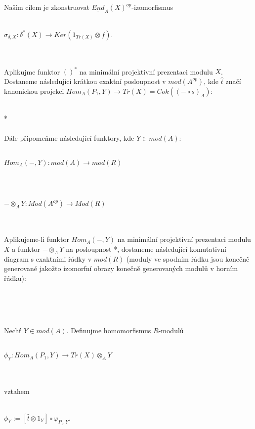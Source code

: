      Naším cílem je zkonstruovat $\underline{End}_A(X)^{op}$-izomorfismus \\\\
      \centerline{$\sigma_{\delta,X}:\delta^*(X)\rightarrow Ker(1_{Tr(X)}\otimes f)$.} \\\\
      Aplikujme funktor $()^*$ na minimální projektivní prezentaci modulu $X$.  
      Dostaneme následující krátkou exaktní posloupnost v $mod(A^{op})$, kde $\hat{t}$ 
      značí kanonickou projekci $Hom_A(P_1,Y)\rightarrow Tr(X)=Cok((-\circ 
      s)_A)$:\\\\
      \centerline{}*\\\\
      Dále připomeňme následující funktory, kde $Y\in mod(A):$\\\\
      \centerline{$Hom_A(-,Y):mod(A)\rightarrow mod(R)$}\\\\
      \centerline{$-\otimes_A Y: Mod(A^{op})\rightarrow Mod(R)$}\\\\
      Aplikujeme-li funktor $Hom_A(-,Y)$ na minimální projektivní prezentaci 
      modulu $X$ a funktor $-\otimes_A Y$ na posloupnost *, dostaneme 
      následující komutativní diagram s exaktními řádky v $mod(R)$ (moduly ve spodním 
      řádku jsou konečně generované jakožto izomorfní obrazy konečně 
      generovaných modulů v horním řádku):\\\\
      \centerline{}\\\\
      
      \begin{dfn}\label{def-phi} 
        Nechť $Y\in mod(A)$. Definujme homomorfismus $R$-modulů \\\\
        \centerline{$\phi_Y:Hom_A(P_1,Y)\rightarrow Tr(X)\otimes_A Y$} \\\\
        vztahem \\\\
        \centerline{$\phi_Y:=[\hat{t}\otimes 1_Y]\circ\varphi_{P_1,Y}$.}\\
      \end{dfn}
      
